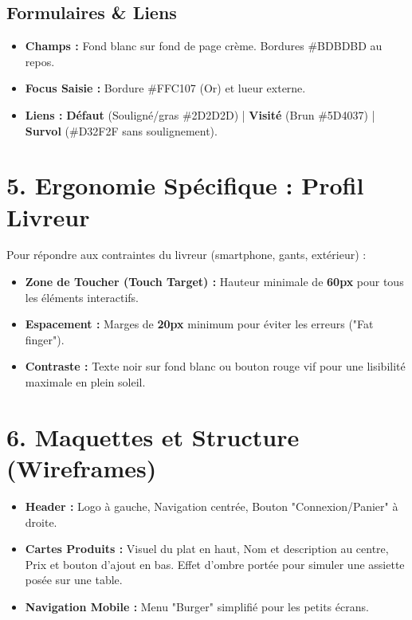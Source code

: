 \documentclass[12pt,a4paper]{article}
\begin{document}
\subsection{Formulaires \& Liens}
\begin{itemize}[label=\textcolor{CoalBlack}{\tiny\faCircle}, itemsep=0pt]
    \item \textbf{Champs :} Fond blanc sur fond de page crème. Bordures \#BDBDBD au repos.
    \item \textbf{Focus Saisie :} Bordure \#FFC107 (Or) et lueur externe.
    \item \textbf{Liens :} \textbf{Défaut} (Souligné/gras \#2D2D2D) | \textbf{Visité} (Brun \#5D4037) | \textbf{Survol} (\#D32F2F sans soulignement).
\end{itemize}

\section{5. Ergonomie Spécifique : Profil Livreur \faMotorcycle}
Pour répondre aux contraintes du livreur (smartphone, gants, extérieur) :
\begin{tcolorbox}[colback=white, colframe=GrillRed, arc=0mm, boxrule=1.5pt, drop fuzzy shadow]
    \begin{itemize}[label=\textcolor{GrillRed}{\faHandPointer}]
        \item \textbf{Zone de Toucher (Touch Target) :} Hauteur minimale de \textbf{60px} pour tous les éléments interactifs.
        \item \textbf{Espacement :} Marges de \textbf{20px} minimum pour éviter les erreurs ("Fat finger").
        \item \textbf{Contraste :} Texte noir sur fond blanc ou bouton rouge vif pour une lisibilité maximale en plein soleil.
    \end{itemize}
\end{tcolorbox}

\section{6. Maquettes et Structure (Wireframes)}
\begin{itemize}[label=\textcolor{CoalBlack}{\faLayerGroup}]
    \item \textbf{Header :} Logo à gauche, Navigation centrée, Bouton "Connexion/Panier" à droite.
    \item \textbf{Cartes Produits :} Visuel du plat en haut, Nom et description au centre, Prix et bouton d'ajout en bas. Effet d'ombre portée pour simuler une assiette posée sur une table.
    \item \textbf{Navigation Mobile :} Menu "Burger" simplifié pour les petits écrans.
\end{itemize}
\end{document}
